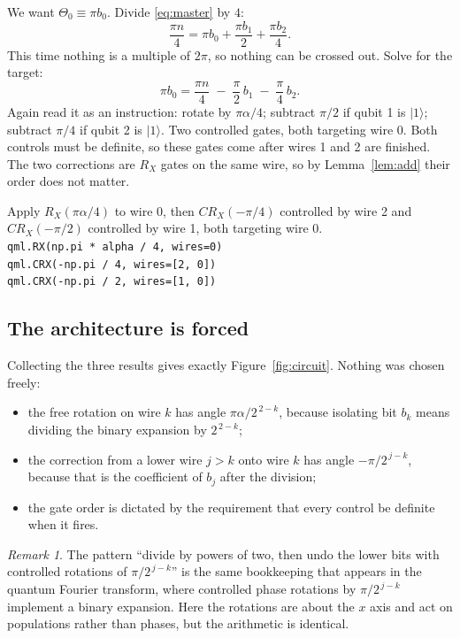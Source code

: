 \documentclass[11pt,a4paper]{article}
\newcommand{\ket}[1]{\lvert #1 \rangle}
\newcommand{\RX}{R_X}
\newcommand{\CRX}{CR_X}
\newcommand{\code}[1]{\texttt{#1}}
\theoremstyle{plain}
\theoremstyle{definition}
\theoremstyle{remark}
\newtheorem{remark}[lemma]{Remark}
\begin{document}
We want $\Theta_0 \equiv \pi b_0$. Divide \eqref{eq:master} by $4$:
\[
\frac{\pi n}{4} = \pi b_0 + \frac{\pi b_1}{2} + \frac{\pi b_2}{4}.
\]
This time nothing is a multiple of $2\pi$, so nothing can be crossed out. Solve for the target:
\begin{equation}\label{eq:wire0}
\pi b_0 = \frac{\pi n}{4} \;-\; \frac{\pi}{2}\,b_1 \;-\; \frac{\pi}{4}\,b_2 .
\end{equation}
Again read it as an instruction: rotate by $\pi\alpha/4$; subtract $\pi/2$ if qubit 1 is
$\ket{1}$; subtract $\pi/4$ if qubit 2 is $\ket{1}$. Two controlled gates, both targeting wire 0.
Both controls must be definite, so these gates come after wires 1 and 2 are finished. The two
corrections are $\RX$ gates on the same wire, so by Lemma~\ref{lem:add} their order does not
matter.

\begin{resultbox}
Apply $\RX(\pi\alpha/4)$ to wire 0, then $\CRX(-\pi/4)$ controlled by wire 2 and $\CRX(-\pi/2)$
controlled by wire 1, both targeting wire 0.\\[3pt]
\code{qml.RX(np.pi * alpha / 4, wires=0)}\\
\code{qml.CRX(-np.pi / 4, wires=[2, 0])}\\
\code{qml.CRX(-np.pi / 2, wires=[1, 0])}
\end{resultbox}

\subsection{The architecture is forced}

Collecting the three results gives exactly Figure~\ref{fig:circuit}. Nothing was chosen freely:
\begin{itemize}[nosep]
\item the free rotation on wire $k$ has angle $\pi\alpha/2^{\,2-k}$, because isolating bit $b_k$
      means dividing the binary expansion by $2^{\,2-k}$;
\item the correction from a lower wire $j>k$ onto wire $k$ has angle $-\pi/2^{\,j-k}$, because
      that is the coefficient of $b_j$ after the division;
\item the gate order is dictated by the requirement that every control be definite when it fires.
\end{itemize}

\begin{remark}
The pattern ``divide by powers of two, then undo the lower bits with controlled rotations of
$\pi/2^{\,j-k}$'' is the same bookkeeping that appears in the quantum Fourier transform, where
controlled phase rotations by $\pi/2^{\,j-k}$ implement a binary expansion. Here the rotations
are about the $x$ axis and act on populations rather than phases, but the arithmetic is identical.
\end{remark}
\end{document}
